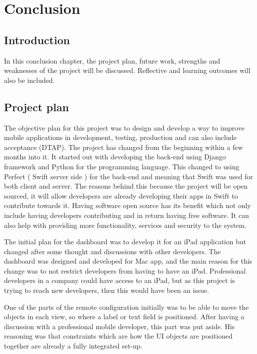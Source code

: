 \chapter{Conclusion}

\label{ch:conclusions}

\section{Introduction}

In this conclusion chapter, the project plan, future work, strengths and weaknesses of the project will be discussed. Reflective and learning outcomes will also be included.

\section{Project plan}

The objective plan for this project was to design and develop a way to improve mobile applications in development, testing, production and can also include acceptance (DTAP). The project has changed from the beginning within a few months into it. It started out with developing the back-end using Django framework and Python for the programming language. This changed to using Perfect ( Swift server side ) for the back-end and meaning that Swift was used for both client and server. The reasons behind this because the project will be open sourced, it will allow developers are already developing their apps in Swift to contribute towards it. Having software open source has its benefit which not only include having developers contributing and in return having free software. It can also help with providing more functionality, services and security to the system.

The initial plan for the dashboard was to develop it for an iPad application but changed after some thought and discussions with other developers. The dashboard was designed and developed for Mac app, and the main reason for this change was to not restrict developers from having to have an iPad. Professional developers in a company could have access to an iPad, but as this project is trying to reach new developers, then this would have been an issue.

One of the parts of the remote configuration initially was to be able to move the objects in each view, so where a label or text field is positioned. After having a discussion with a professional mobile developer, this part was put aside. His reasoning was that constraints which are how the UI objects are positioned together are already a fully integrated set-up.

